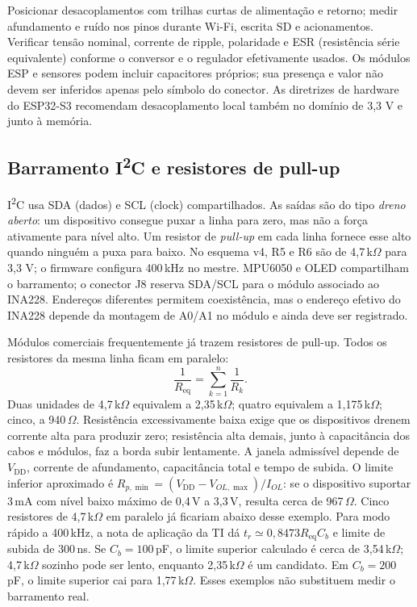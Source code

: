 Posicionar desacoplamentos com trilhas curtas de alimentação e retorno; medir afundamento e ruído nos pinos durante Wi-Fi, escrita SD e acionamentos. Verificar tensão nominal, corrente de ripple, polaridade e ESR (resistência série equivalente) conforme o conversor e o regulador efetivamente usados. Os módulos ESP e sensores podem incluir capacitores próprios; sua presença e valor não devem ser inferidos apenas pelo símbolo do conector. As diretrizes de hardware do ESP32-S3 recomendam desacoplamento local também no domínio de 3,3 V e junto à memória.

\subsection{Barramento \texorpdfstring{I\textsuperscript{2}C}{I2C} e resistores de pull-up}
I\textsuperscript{2}C usa SDA (dados) e SCL (clock) compartilhados. As saídas são do tipo \emph{dreno aberto}: um dispositivo consegue puxar a linha para zero, mas não a força ativamente para nível alto. Um resistor de \emph{pull-up} em cada linha fornece esse alto quando ninguém a puxa para baixo. No esquema v4, R5 e R6 são de 4,7\,k$\Omega$ para 3,3 V; o firmware configura 400\,kHz no mestre. MPU6050 e OLED compartilham o barramento; o conector J8 reserva SDA/SCL para o módulo associado ao INA228. Endereços diferentes permitem coexistência, mas o endereço efetivo do INA228 depende da montagem de A0/A1 no módulo e ainda deve ser registrado.

Módulos comerciais frequentemente já trazem resistores de pull-up. Todos os resistores da mesma linha ficam em paralelo:
\begin{equation}
\frac{1}{R_{\mathrm{eq}}}=\sum_{k=1}^{n}\frac{1}{R_k}.
\label{eq:pullup}
\end{equation}
Duas unidades de 4,7\,k$\Omega$ equivalem a 2,35\,k$\Omega$; quatro equivalem a 1,175\,k$\Omega$; cinco, a 940\,$\Omega$. Resistência excessivamente baixa exige que os dispositivos drenem corrente alta para produzir zero; resistência alta demais, junto à capacitância dos cabos e módulos, faz a borda subir lentamente. A janela admissível depende de $V_{\mathrm{DD}}$, corrente de afundamento, capacitância total e tempo de subida. O limite inferior aproximado é $R_{p,\min}=(V_{\mathrm{DD}}-V_{OL,\max})/I_{OL}$: se o dispositivo suportar 3\,mA com nível baixo máximo de 0,4\,V a 3,3\,V, resulta cerca de 967\,$\Omega$. Cinco resistores de 4,7\,k$\Omega$ em paralelo já ficariam abaixo desse exemplo. Para modo rápido a 400\,kHz, a nota de aplicação da TI dá $t_r \simeq 0{,}8473R_{\mathrm{eq}}C_b$ e limite de subida de 300\,ns. Se $C_b=100$\,pF, o limite superior calculado é cerca de 3,54\,k$\Omega$; 4,7\,k$\Omega$ sozinho pode ser lento, enquanto 2,35\,k$\Omega$ é um candidato. Em $C_b=200$\,pF, o limite superior cai para 1,77\,k$\Omega$. Esses exemplos não substituem medir o barramento real.

